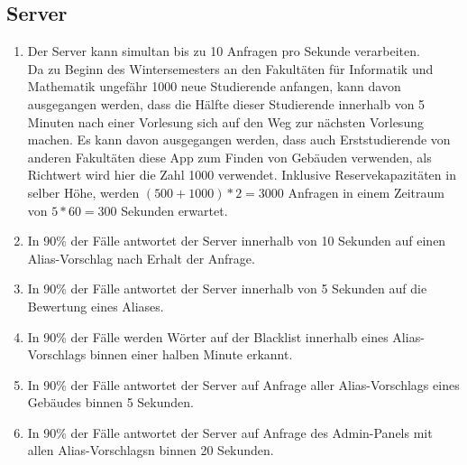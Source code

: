 \subsection*{Server}

\begin{samepage}
    \begin{enumerate}[label=\textbf{/NFL\arabic*0/}, align=left, start=12]
        \item Der \Gls{Server} kann \gls{simultan} bis zu 10 Anfragen pro Sekunde verarbeiten. \\
              Da zu Beginn des Wintersemesters an den Fakultäten für Informatik und Mathematik ungefähr 1000 neue Studierende anfangen,
              kann davon ausgegangen werden, dass die Hälfte dieser Studierende innerhalb von 5 Minuten nach einer Vorlesung sich auf den Weg zur nächsten Vorlesung machen.
              Es kann davon ausgegangen werden, dass auch Erststudierende von anderen Fakultäten diese App zum Finden von Gebäuden verwenden, als Richtwert wird hier die Zahl 1000 verwendet.
              Inklusive Reservekapazitäten in selber Höhe, werden $(500 + 1000) * 2 = 3000$ Anfragen in einem Zeitraum von $5 * 60 = 300$ Sekunden erwartet.
        \item In 90\% der Fälle antwortet der \Gls{Server} innerhalb von 10 Sekunden auf einen \Gls{Alias-Vorschlag} nach Erhalt der Anfrage.
        \item In 90\% der Fälle antwortet der \Gls{Server} innerhalb von 5 Sekunden auf die Bewertung eines Aliases.
        \item In 90\% der Fälle werden Wörter auf der \Gls{Blacklist} innerhalb eines \Gls{Alias-Vorschlag}s binnen einer halben Minute erkannt.
        \item In 90\% der Fälle antwortet der \Gls{Server} auf Anfrage aller \Glspl{Alias-Vorschlag} eines Gebäudes binnen 5 Sekunden.
        \item In 90\% der Fälle antwortet der \Gls{Server} auf Anfrage des \Gls{Admin-Panel}s mit allen \Glspl{Alias-Vorschlag}n binnen 20 Sekunden.
    \end{enumerate}
\end{samepage}
